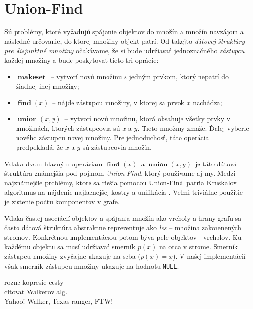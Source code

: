 \def\uf{Union-Find}
\def\null{\texttt{NULL}}
\def\makeset{$\mathop{\mathbf{makeset}}$}
\def\find{$\mathop{\mathbf{find}}(x)$}
\def\union{$\mathop{\mathbf{union}}(x, y)$}

\section{\uf}
Sú problémy, ktoré vyžadujú spájanie objektov do množín a množín navzájom 
a následné určovanie, do ktorej množiny objekt patrí. Od takejto \emph{
dátovej štruktúry pre disjunktné množiny} očakávame, že si bude udržiavať 
jednoznačného \emph{zástupcu} každej množiny a bude poskytovať 
tieto tri oprácie: 
\begin{itemize}
\item \makeset\ -- vytvorí novú množinu s jedným prvkom, ktorý 
nepatrí do žiadnej inej množiny;
\item \find\ -- nájde zástupcu množiny, v ktorej sa 
prvok $x$ nachádza;
\item \union\ -- vytvorí novú množinu, ktorá obsahuje 
všetky prvky v množinách, ktorých zástupcovia sú $x$ a $y$. Tieto 
množiny zmaže. Ďalej vyberie nového zástupcu novej množiny. Pre 
jednoduchosť, táto operácia predpokladá, že $x$ a $y$ sú 
zástupcovia množín.
\end{itemize}
Vďaka dvom hlavným operáciam \find\ a \union\ 
je táto dátová štruktúra známejšia pod pojmom \emph{\uf}, ktorý 
používame aj my. Medzi najznámejšie problémy, ktoré sa riešia pomocou 
\uf\ patria Kruskalov algoritmus na nájdenie najlacnejšej kostry 
\citep{kruskal} a unifikácia \citep{unif}. Veľmi triviálne použitie je 
zistenie počtu komponentov v grafe.

Vďaka častej asociácií objektov a spájania množín ako vrcholy a hrany grafu 
sa často dátová štruktúra abstraktne reprezentuje ako 
\emph{les} -- množina zakorenených stromov. 
Konkrétnou implementáciou potom býva pole objektov---vrcholov. Ku každému 
objektu sa musí udržiavať smerník $p(x)$ na otca v strome. Smerník zástupcu 
množiny zvyčajne ukazuje na seba ($p(x) = x$). V našej implementácií však 
smerník zástupcu množiny ukazuje na hodnotu \null.

rozne kopresie cesty\\
citovat Walkerov alg.
\\
Yahoo! Walker, Texas ranger, FTW!